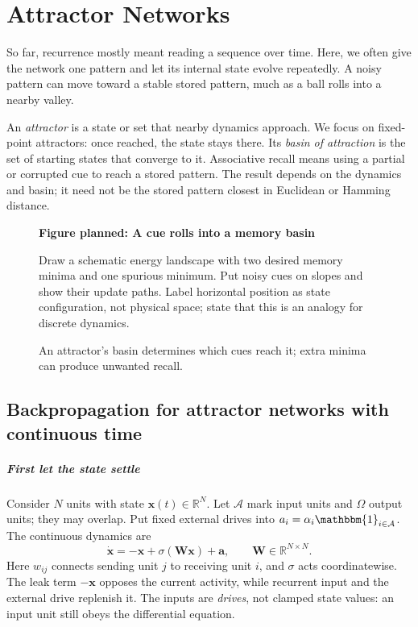 \documentclass[11pt, oneside]{book}
\newcommand{\R}{\mathbb{R}}
\let\originalsection\section
\renewcommand{\section}{\Needspace{7\baselineskip}\originalsection}
\newcommand{\figureplaceholder}[5]{%
\begin{figure}[htbp]
\centering
\begin{tcolorbox}[unbreakable,width=\linewidth,height=#1,colback=accent!3,
  colframe=accent!30,boxrule=0.5pt,arc=2.5mm,sharp corners=all,
  valign=center,halign=center,fontupper=\small]
{\bfseries\color{accent}Figure planned: #2}\par\medskip
{\color{gray!75!black}#3}
\end{tcolorbox}
\caption{#4}\label{#5}
\end{figure}}
\begin{document}
\chapter{Attractor Networks}\label{ch:source-10}
So far, recurrence mostly meant reading a sequence over time. Here, we often give the network one pattern and let its internal state evolve repeatedly. A noisy pattern can move toward a stable stored pattern, much as a ball rolls into a nearby valley.

An \emph{attractor} is a state or set that nearby dynamics approach. We focus on fixed-point attractors: once reached, the state stays there. Its \emph{basin of attraction} is the set of starting states that converge to it. Associative recall means using a partial or corrupted cue to reach a stored pattern. The result depends on the dynamics and basin; it need not be the stored pattern closest in Euclidean or Hamming distance.

\figureplaceholder{3.4cm}{A cue rolls into a memory basin}{Draw a schematic energy landscape with two desired memory minima and one spurious minimum. Put noisy cues on slopes and show their update paths. Label horizontal position as state configuration, not physical space; state that this is an analogy for discrete dynamics.}{An attractor's basin determines which cues reach it; extra minima can produce unwanted recall.}{fig:attractor-basins}

\section{Backpropagation for attractor networks with continuous time}\label{sec:source-10-1}
\paragraph{First let the state settle} Consider $N$ units with state $\mathbf{x}(t)\in\R^N$. Let $\mathcal{A}$ mark input units and $\Omega$ output units; they may overlap. Put fixed external drives into $a_i=\alpha_i\mathbbm{1}_{i\in\mathcal{A}}$. The continuous dynamics are
\[
 \dot{\mathbf{x}}=-\mathbf{x}+\sigma(\mathbf{W}\mathbf{x})+\mathbf{a},
 \qquad \mathbf{W}\in\R^{N\times N}.
\]
Here $w_{ij}$ connects sending unit $j$ to receiving unit $i$, and $\sigma$ acts coordinatewise. The leak term $-\mathbf{x}$ opposes the current activity, while recurrent input and the external drive replenish it. The inputs are \emph{drives}, not clamped state values: an input unit still obeys the differential equation.
\end{document}
